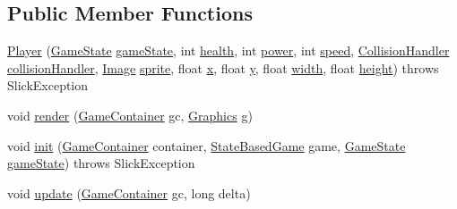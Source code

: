 \subsection*{Public Member Functions}
\begin{DoxyCompactItemize}
\item 
\mbox{\hyperlink{classentities_1_1_player_afb9d6ae0aa37d3b73420655ca2eb603b}{Player}} (\mbox{\hyperlink{classstates_1_1_game_state}{Game\+State}} \mbox{\hyperlink{classentities_1_1_player_a5c0c41f4ba8b9647580089c5314cd3a6}{game\+State}}, int \mbox{\hyperlink{classentities_1_1_subject_a8285660fdae3f0b220bbc686cf5c012c}{health}}, int \mbox{\hyperlink{classentities_1_1_subject_a7bd41d6fe9656de66d4a08c4a9565ec4}{power}}, int \mbox{\hyperlink{classentities_1_1_mobile_entity_a815a9d2b23a0bb7e3ee7739d4c10d7c3}{speed}}, \mbox{\hyperlink{classentities_1_1_collision_handler}{Collision\+Handler}} \mbox{\hyperlink{classentities_1_1_mobile_entity_a29fbe797671b1fc81eafe1e48fdc46f9}{collision\+Handler}}, \mbox{\hyperlink{classorg_1_1newdawn_1_1slick_1_1_image}{Image}} \mbox{\hyperlink{classentities_1_1_physical_entity_aeb439b2308ab19fb6d3ff6be6f7cdbd8}{sprite}}, float \mbox{\hyperlink{classorg_1_1newdawn_1_1slick_1_1geom_1_1_shape_a3e985bfff386c15a4efaad03d8ad60d3}{x}}, float \mbox{\hyperlink{classorg_1_1newdawn_1_1slick_1_1geom_1_1_shape_a9f934baded6a1b65ebb69e7e5f80ea00}{y}}, float \mbox{\hyperlink{classorg_1_1newdawn_1_1slick_1_1geom_1_1_rectangle_a967e1823f62daf45abb142779d1be62d}{width}}, float \mbox{\hyperlink{classorg_1_1newdawn_1_1slick_1_1geom_1_1_rectangle_a3bd010fdce636fc11ed0e0ad4d4b4a0a}{height}})  throws Slick\+Exception 
\item 
void \mbox{\hyperlink{classentities_1_1_player_a213cd954c2c29ef74e6e91a31c03befe}{render}} (\mbox{\hyperlink{classorg_1_1newdawn_1_1slick_1_1_game_container}{Game\+Container}} gc, \mbox{\hyperlink{classorg_1_1newdawn_1_1slick_1_1_graphics}{Graphics}} g)
\item 
void \mbox{\hyperlink{classentities_1_1_player_a3ec19c021327522cc987ae6c4610338e}{init}} (\mbox{\hyperlink{classorg_1_1newdawn_1_1slick_1_1_game_container}{Game\+Container}} container, \mbox{\hyperlink{classorg_1_1newdawn_1_1slick_1_1state_1_1_state_based_game}{State\+Based\+Game}} game, \mbox{\hyperlink{classstates_1_1_game_state}{Game\+State}} \mbox{\hyperlink{classentities_1_1_player_a5c0c41f4ba8b9647580089c5314cd3a6}{game\+State}})  throws Slick\+Exception 
\item 
void \mbox{\hyperlink{classentities_1_1_player_abd693dd7c24c59d268906f115f9a4a3b}{update}} (\mbox{\hyperlink{classorg_1_1newdawn_1_1slick_1_1_game_container}{Game\+Container}} gc, long delta)

\end{DoxyCompactItemize}
